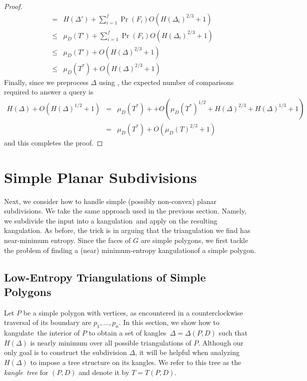 \documentclass[charterfonts,lotsofwhite]{patmorin}
\newcommand{\kangle}{kangle}
\newcommand{\kangles}{kangles}
\newcommand{\kangulation}{kangulation}
\newcommand{\kangulate}{kangulate}
\begin{document}
\begin{proof}
\begin{eqnarray*}
    &  =  & H(\Delta') + \sum_{i=1}^f\Pr(F_i) O(H(\Delta_i)^{2/3}+1) \\ 
    & \le & \mu_D(T') + \sum_{i=1}^f\Pr(F_i) O(H(\Delta_i)^{2/3}+1) \\ 
    & \le & \mu_D(T') + O(H(\Delta)^{2/3}+1) \\
    & \le & \mu_D(T^*) + O(H(\Delta)^{2/3}+1)
\end{eqnarray*}
Finally, since we preprocess $\Delta$ using , the
expected number of comparisons required to answer a query is
\begin{eqnarray*}
  H(\Delta) + O(H(\Delta)^{1/2} + 1)
   & = & \mu_D(T^*) + + O(\mu_D(T^*)^{1/2} + H(\Delta)^{2/3} + H(\Delta)^{1/3} + 1) \\
   & = & \mu_D(T^*) + O(\mu_D(T)^{2/3} + 1)
\end{eqnarray*}
and this completes the proof.
\end{proof}

\section{Simple Planar Subdivisions}

Next, we consider how to handle simple (possibly non-convex) planar
subdivisions.  We take the same approach used in the previous section.
Namely, we subdivide the input into a \kangulation\ and apply
  on the resulting \kangulation.  As before, the trick
is in arguing that the triangulation we find has near-minimum entropy.
Since the faces of $G$ are simple polygons, we first tackle the
problem of finding a (near) minimum-entropy \kangulation of a simple
polygon.

\subsection{Low-Entropy Triangulations of Simple Polygons}

Let $P$ be a simple polygon with vertices, as encountered in a
counterclockwise traversal of its boundary are $p_1,\ldots,p_n$.  In
this section, we show how to \kangulate\ the interior of $P$ to obtain
a set of \kangles\ $\Delta=\Delta(P,D)$ such that $H(\Delta)$ is
nearly minimum over all possible triangulations of $P$.  Although our
only goal is to construct the subdivision $\Delta$, it will be helpful
when analyzing $H(\Delta)$ to impose a tree structure on its \kangles.
We refer to this tree as the \emph{\kangle\ tree} for $(P,D)$ and
denote it by $T=T(P,D)$.
\end{document}
